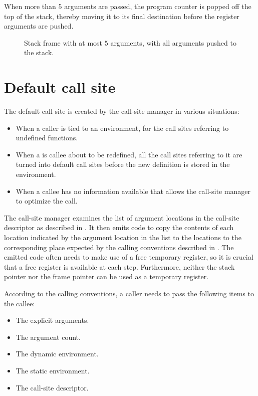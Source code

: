 When more than $5$ arguments are passed, the program counter
is popped off the top of the stack, thereby moving it to its final
destination before the register arguments are pushed.


\begin{figure}
\begin{center}
\end{center}
\caption{\label{fig-x86-64-stack-frame-with-pushed-arguments}
  Stack frame with at most $5$ arguments, with all arguments pushed
  to the stack.}
\end{figure}

\section{Default call site}

The default call site is created by the call-site manager in various
situations:

\begin{itemize}
\item When a caller is tied to an environment, for the call sites
  referring to undefined functions.
\item When a is callee about to be redefined, all the call sites
  referring to it are turned into default call sites before the new
  definition is stored in the environment.
\item When a callee has no information available that allows the
  call-site manager to optimize the call.
\end{itemize}

The call-site manager examines the list of argument locations in the
call-site descriptor as described in
.  It then emits code to copy the
contents of each location indicated by the argument location in the
list to the locations to the corresponding place expected by the
calling conventions described in .
The emitted code often needs to make use of a free temporary register,
so it is crucial that a free register is available at each step.
Furthermore, neither the stack pointer nor the frame pointer can
be used as a temporary register.

According to the calling conventions, a caller needs to pass the
following items to the callee:

\begin{itemize}
\item The explicit arguments.
\item The argument count.
\item The dynamic environment.
\item The static environment.
\item The call-site descriptor.
\end{itemize}

